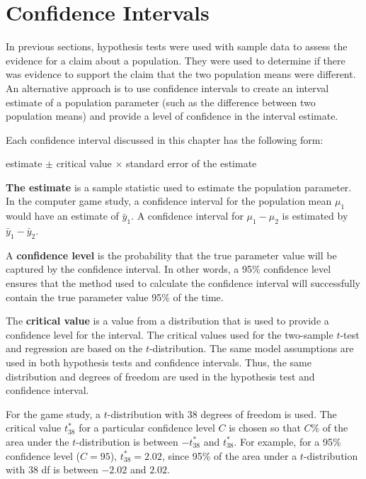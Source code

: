 \documentclass[
]{report}
\begin{document}
\section{\texorpdfstring{\textbf{Confidence Intervals}}{Confidence Intervals}}\label{confidence-intervals}

In previous sections, hypothesis tests were used with sample data to assess the evidence for a claim about a population. They were used to determine if there was evidence to support the claim that the two population means were different. An alternative approach is to use confidence intervals to create an interval estimate of a population parameter (such as the difference between two population means) and provide a level of confidence in the interval estimate.

Each confidence interval discussed in this chapter has the following form:

estimate \(\pm\) critical value \(\times\) standard error of the estimate

\textbf{The estimate} is a sample statistic used to estimate the population parameter. In the computer game study, a confidence interval for the population mean \(\mu_1\) would have an estimate of \(\bar{y}_1\). A confidence interval for \(\mu_1 - \mu_2\) is estimated by \(\bar{y}_1 - \bar{y}_2\).

A \textbf{confidence level} is the probability that the true parameter value will be captured by the confidence interval. In other words, a 95\% confidence level ensures that the method used to calculate the confidence interval will successfully contain the true parameter value 95\% of the time.

The \textbf{critical value} is a value from a distribution that is used to provide a confidence level for the interval. The critical values used for the two-sample \(t\)-test and regression are based on the \(t\)-distribution. The same model assumptions are used in both hypothesis tests and confidence intervals. Thus, the same distribution and degrees of freedom are used in the hypothesis test and confidence interval.

For the game study, a \(t\)-distribution with 38 degrees of freedom is used. The critical value \(t^*_{38}\) for a particular confidence level \(C\) is chosen so that \(C\)\% of the area under the \(t\)-distribution is between \(-t^*_{38}\) and \(t^*_{38}\). For example, for a 95\% confidence level (\(C = 95\)), \(t^*_{38} = 2.02\), since 95\% of the area under a \(t\)-distribution with 38 df is between \(-2.02\) and \(2.02\).
\end{document}
